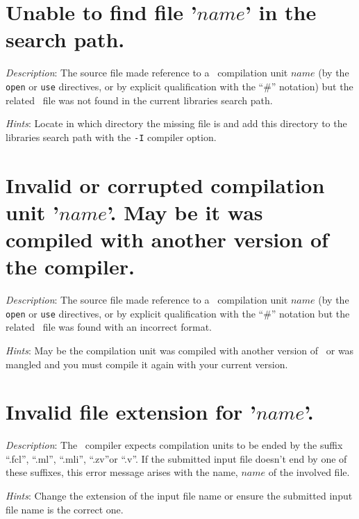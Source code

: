 


\section*{Unable to find file '$name$' in the search path.}

{\em Description}: The source file made reference to a \focal\
compilation unit 
$name$ (by the {\tt open} or {\tt use} directives, or by explicit
qualification with the ``\#'' notation) but the related
\focal\ file was not found in the current libraries search
path.

{\em Hints}: Locate in which directory the missing  file is
and add this directory to the libraries search path with the {\tt -I}
compiler option.



\section*{Invalid or corrupted compilation unit '$name$'. May be it
  was compiled with another version of the compiler.}
{\em Description}: The source file made reference to a \focal\
compilation unit
$name$ (by the {\tt open} or {\tt use} directives, or by explicit
qualification with the ``\#'' notation but the related
\focal\  file was found with an incorrect format.

{\em Hints}: May be the compilation unit was compiled with another
version of \focal\ or was mangled and you must compile it again with
your current version.



\section*{Invalid file extension for '$name$'.}
{\em Description}: The \focal\ compiler expects compilation units to be
ended by the suffix ``.fcl'', ``.ml'', ``.mli'', ``.zv''or ``.v''. If
the submitted input file doesn't end by one of these suffixes, this
error message arises with the name, $name$ of the involved file.

{\em Hints}: Change the extension of the input file name or ensure the
submitted input file name is the correct one.



